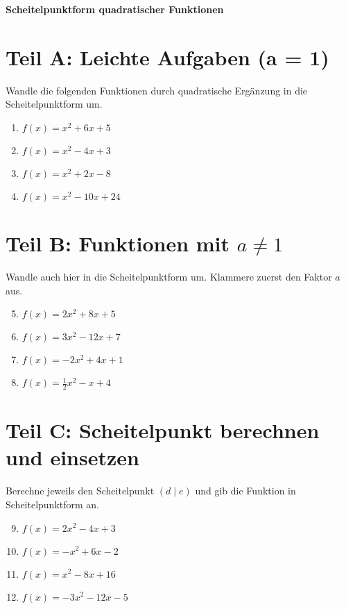 \begin{center}
    \textbf{Scheitelpunktform quadratischer Funktionen}
\end{center}

\section*{Teil A: Leichte Aufgaben (a = 1)}

Wandle die folgenden Funktionen durch quadratische Ergänzung in die Scheitelpunktform um.

\begin{enumerate}[1)]
  \item \( f(x) = x^2 + 6x + 5 \)
  \item \( f(x) = x^2 - 4x + 3 \)
  \item \( f(x) = x^2 + 2x - 8 \)
  \item \( f(x) = x^2 - 10x + 24 \)
\end{enumerate}

\vspace{1em}

\section*{Teil B: Funktionen mit \( a \ne 1 \)}

Wandle auch hier in die Scheitelpunktform um. Klammere zuerst den Faktor \( a \) aus.

\begin{enumerate}[1)]
\setcounter{enumi}{4}
  \item \( f(x) = 2x^2 + 8x + 5 \)
  \item \( f(x) = 3x^2 - 12x + 7 \)
  \item \( f(x) = -2x^2 + 4x + 1 \)
  \item \( f(x) = \frac{1}{2}x^2 - x + 4 \)
\end{enumerate}

\vspace{1em}

\section*{Teil C: Scheitelpunkt berechnen und einsetzen}

Berechne jeweils den Scheitelpunkt \((d \mid e)\) und gib die Funktion in Scheitelpunktform an.

\begin{enumerate}[1)]
\setcounter{enumi}{8}
  \item \( f(x) = 2x^2 - 4x + 3 \)
  \item \( f(x) = -x^2 + 6x - 2 \)
  \item \( f(x) = x^2 - 8x + 16 \)
  \item \( f(x) = -3x^2 - 12x - 5 \)
\end{enumerate}